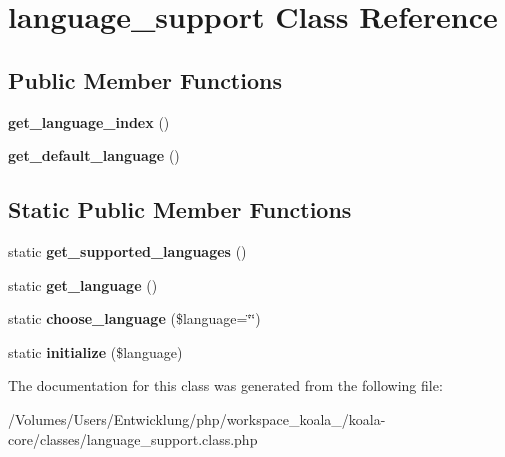 \hypertarget{classlanguage__support}{
\section{language\_\-support Class Reference}
\label{classlanguage__support}
}
\subsection*{Public Member Functions}
\begin{DoxyCompactItemize}
\item 
\hypertarget{classlanguage__support_a4fcc45c32828c482bfc9ab0c3890b25f}{
{\bfseries get\_\-language\_\-index} ()}
\label{classlanguage__support_a4fcc45c32828c482bfc9ab0c3890b25f}

\item 
\hypertarget{classlanguage__support_ac16aa4a12c59ab5afbba9649698f3555}{
{\bfseries get\_\-default\_\-language} ()}
\label{classlanguage__support_ac16aa4a12c59ab5afbba9649698f3555}

\end{DoxyCompactItemize}
\subsection*{Static Public Member Functions}
\begin{DoxyCompactItemize}
\item 
\hypertarget{classlanguage__support_a7cc920a261e0d2c35ea7af7f4d0df9ed}{
static {\bfseries get\_\-supported\_\-languages} ()}
\label{classlanguage__support_a7cc920a261e0d2c35ea7af7f4d0df9ed}

\item 
\hypertarget{classlanguage__support_a6a2837ee51fe905fa90881dbc4f1c65c}{
static {\bfseries get\_\-language} ()}
\label{classlanguage__support_a6a2837ee51fe905fa90881dbc4f1c65c}

\item 
\hypertarget{classlanguage__support_a4e5223fea5a3869e8d81484e1b0ed681}{
static {\bfseries choose\_\-language} (\$language=\char`\"{}\char`\"{})}
\label{classlanguage__support_a4e5223fea5a3869e8d81484e1b0ed681}

\item 
\hypertarget{classlanguage__support_a3116eaa5c4bbff0c968a4eead414247d}{
static {\bfseries initialize} (\$language)}
\label{classlanguage__support_a3116eaa5c4bbff0c968a4eead414247d}

\end{DoxyCompactItemize}


The documentation for this class was generated from the following file:\begin{DoxyCompactItemize}
\item 
/Volumes/Users/Entwicklung/php/workspace\_\-koala\_/koala-\/core/classes/language\_\-support.class.php\end{DoxyCompactItemize}
